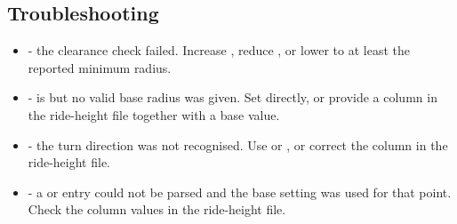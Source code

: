 \subsection{Troubleshooting}
\begin{itemize}
    \item {} - the clearance check failed. Increase , reduce  , or lower  to at least the reported minimum radius.

    \item {} -  is  but no valid base radius was given. Set  directly, or provide a  column in the ride-height file together with a base value.

    \item {} - the turn direction was not recognised. Use  or , or correct the  column in the ride-height file.

    \item {} - a  or  entry could not be parsed and the base setting was used for that point. Check the column values in the ride-height file.
\end{itemize}
